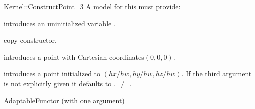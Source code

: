 \begin{ccRefFunctionObjectConcept}{Kernel::ConstructPoint_3}
A model for this must provide:


\ccHidden {}
             {introduces an uninitialized variable .}

\ccHidden {}
            {copy constructor.}

            {introduces a point with Cartesian coordinates$(0,0,0)$.}

\ccHidden{}
            {introduces a point  initialized to $(hx/hw,hy/hw, hz/hw)$.
             If the third argument is not explicitly given it defaults
             to .
             \ccPrecond {} $\neq$ . }

\ccRefines
AdaptableFunctor (with one argument)

\ccSeeAlso
{} \\

\end{ccRefFunctionObjectConcept}
